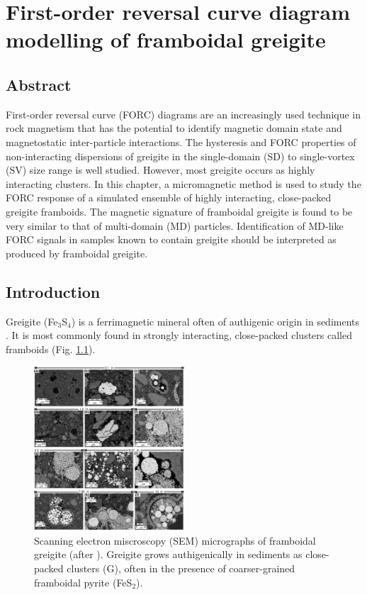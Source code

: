 \chapter{First-order reversal curve diagram modelling of framboidal greigite}
\label{ch:res-4}
\fancyhead[C]{}
\fancyhead[R]{}
\fancyfoot[C]{\thepage}

\section*{Abstract}
First-order reversal curve (FORC) diagrams are an increasingly used technique in rock magnetism that has the potential to identify magnetic domain state and magnetostatic inter-particle interactions. The hysteresis and FORC properties of non-interacting dispersions of greigite in the single-domain (SD) to single-vortex (SV) size range is well studied. However, most greigite occurs as highly interacting clusters. In this chapter, a micromagnetic method is used to study the FORC response of a simulated ensemble of highly interacting, close-packed greigite framboids. The magnetic signature of framboidal greigite is found to be very similar to that of multi-domain (MD) particles. Identification of MD-like FORC signals in samples known to contain greigite should be interpreted as produced by framboidal greigite.

\section{Introduction}
Greigite (Fe$_3$S$_4$) is a ferrimagnetic mineral often of authigenic origin in sediments \citep{Roberts2011}. It is most commonly found in strongly interacting, close-packed clusters called framboids \citep{Ariztegui1996,Rowan2006,Rowan2009,Roberts2011} (Fig. \ref{FIG_F00}).
\begin{figure}
\centering
\includegraphics[width=0.5\textwidth]{research-4/figs/framboids_rowan.pdf}
\caption[SEM micrographs of framboidal greigite]{Scanning electron miscroscopy (SEM) micrographs of framboidal greigite (after \citet{Rowan2009}). Greigite grows authigenically in sediments as close-packed clusters (G), often in the presence of coarser-grained framboidal pyrite (FeS$_2$).}
\label{FIG_F00}
\end{figure}\par


